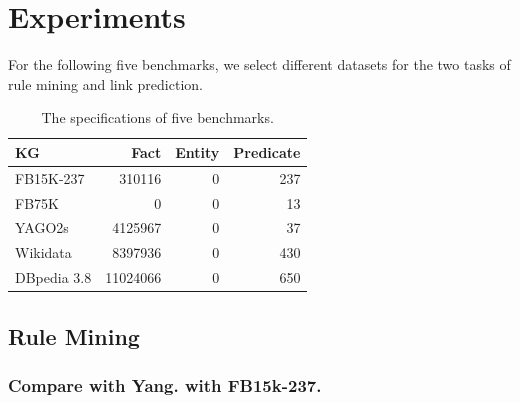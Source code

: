 \documentclass{article}
\begin{document}
%	
%	


	\section{Experiments}
	For the following five benchmarks, we select different datasets for the two tasks of rule mining and link prediction.
	
	\begin{table}[htbp]
		\centering
		\caption{The specifications of five benchmarks.}
		\begin{tabular}{lrrr}
			\toprule  %
			KG & Fact & Entity & Predicate \\ 
			\midrule  %
			FB15K-237 & 310116 & 0 & 237 \\
			FB75K & 0 & 0 & 13 \\
			YAGO2s & 4125967 & 0 & 37 \\
			Wikidata & 8397936 & 0 & 430 \\
			DBpedia 3.8 & 11024066 & 0 & 650 \\
			\bottomrule  %
		\end{tabular}
	\end{table}

	\subsection{Rule Mining}
	\subsubsection{Compare with Yang. with FB15k-237.}
	
\end{document}
